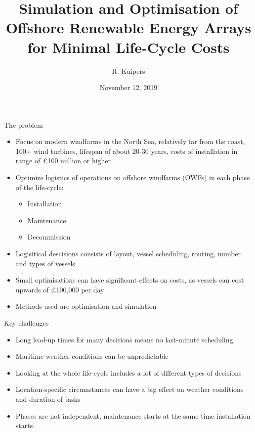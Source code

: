 \documentclass{beamer}
\title[Logistical Optimisation for Offshore Windfarms]{Simulation and Optimisation of Offshore Renewable Energy Arrays for Minimal Life-Cycle Costs}
\author{R. Kuipers}
\date{November 12, 2019}
\begin{document}
\begin{frame}
  \titlepage
\end{frame}

\begin{frame}{The problem}
  \begin{itemize}
  	\item Focus on modern windfarms in the North Sea, relatively far from the coast, 100+ wind turbines, lifespan of about 20-30 years, costs of installation in range of \pounds 100 million or higher
  	\item Optimize logistics of operations on offshore windfarms (OWFs) in each phase of the life-cycle:
  	\begin{itemize}
  		\item Installation
  		\item Maintenance
  		\item Decommission
  	\end{itemize}
  	\item Logisitical descisions consists of layout, vessel scheduling, routing, number and types of vessels
  	\item Small optimisations can have significant effects on costs, as vessels can cost upwards of \pounds 100,000 per day
  	\item Methods used are optimisation and simulation
  \end{itemize}
\end{frame}


\begin{frame}{Key challenges}
  \begin{itemize}
  	\item Long lead-up times for many decisions means no last-minute scheduling
  	\item Maritime weather conditions can be unpredictable
  	\item Looking at the whole life-cycle includes a lot of different types of decisions
  	\item Location-specific circumstances can have a big effect on weather conditions and duration of tasks
  	\item Phases are not independent, maintenance starts at the same time installation starts
  \end{itemize}
\end{frame}
\end{document}
